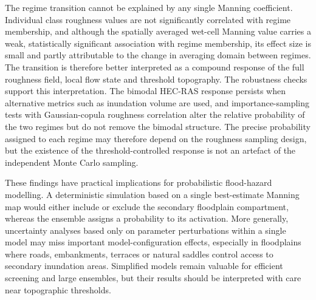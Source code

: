 \documentclass[a4paper,fleqn]{cas-sc}
\newcommand{\hecras}{\textsc{HEC-RAS}}
\begin{document}
The regime transition cannot be explained by any single Manning coefficient. Individual class roughness values are not significantly correlated with regime membership, and although the spatially averaged wet-cell Manning value carries a weak, statistically significant association with regime membership, its effect size is small and partly attributable to the change in averaging domain between regimes. The transition is therefore better interpreted as a compound response of the full roughness field, local flow state and threshold topography. The robustness checks support this interpretation. The bimodal \hecras{} response persists when alternative metrics such as inundation volume are used, and importance-sampling tests with Gaussian-copula roughness correlation alter the relative probability of the two regimes but do not remove the bimodal structure. The precise probability assigned to each regime may therefore depend on the roughness sampling design, but the existence of the threshold-controlled response is not an artefact of the independent Monte Carlo sampling.

These findings have practical implications for probabilistic flood-hazard modelling. A deterministic simulation based on a single best-estimate Manning map would either include or exclude the secondary floodplain compartment, whereas the ensemble assigns a probability to its activation. More generally, uncertainty analyses based only on parameter perturbations within a single model may miss important model-configuration effects, especially in floodplains where roads, embankments, terraces or natural saddles control access to secondary inundation areas. Simplified models remain valuable for efficient screening and large ensembles, but their results should be interpreted with care near topographic thresholds.
\end{document}
